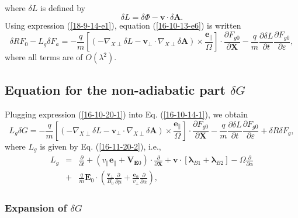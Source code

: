 \documentclass{llncs}
\newcommand{\tmmathbf}[1]{\ensuremath{\boldsymbol{#1}}}
\begin{document}
where $\delta L$ is defined by
\begin{equation}
  \label{19-1-2-p1} \delta L = \delta \Phi -\mathbf{v} \cdot \delta
  \mathbf{A}.
\end{equation}
Using expression (\ref{18-9-14-e1}), equation (\ref{16-10-13-e6}) is written
\begin{equation}
  \label{16-10-20-1} \delta R F_0 - L_g \delta F_a = - \frac{q}{m} \left[ (-
  \nabla_{X \perp} \delta L -\mathbf{v}_{\perp} \cdot \nabla_{X \perp} \delta
  \mathbf{A}) \times \frac{\tmmathbf{e}_{\parallel}}{\Omega} \right] \cdot
  \frac{\partial F_{g 0}}{\partial \mathbf{X}} - \frac{q}{m}  \frac{\partial
  \delta L}{\partial t}  \frac{\partial F_{g 0}}{\partial \varepsilon},
\end{equation}
where all terms are of $O (\lambda^2)$.

\subsection{Equation for the non-adiabatic part $\delta G$}

Plugging expression (\ref{16-10-20-1}) into Eq. (\ref{16-10-14-1}), we obtain
\begin{equation}
  \label{16-10-14-3} L_g \delta G = - \frac{q}{m} \left[ (- \nabla_{X \perp}
  \delta L -\mathbf{v}_{\perp} \cdot \nabla_{X \perp} \delta \mathbf{A})
  \times \frac{\tmmathbf{e}_{\parallel}}{\Omega} \right] \cdot \frac{\partial
  F_{g 0}}{\partial \mathbf{X}} - \frac{q}{m}  \frac{\partial \delta
  L}{\partial t}  \frac{\partial F_{g 0}}{\partial \varepsilon} + \delta R
  \delta F_g,
\end{equation}
where $L_g$ is given by Eq. (\ref{16-11-20-2}), i.e.,
\begin{eqnarray}
  L_g & = & \frac{\partial}{\partial t} + (v_{\parallel}
  \mathbf{e}_{\parallel} +\mathbf{V}_{\mathbf{E}0}) \cdot
  \frac{\partial}{\partial \mathbf{X}} +\mathbf{v} \cdot
  [\tmmathbf{\lambda}_{B 1} +\tmmathbf{\lambda}_{B 2}] - \Omega
  \frac{\partial}{\partial \alpha} \nonumber\\
  & + & \frac{q}{m} \mathbf{E}_0 \cdot \left( \frac{\mathbf{v}_{\perp}}{B_0} 
  \frac{\partial}{\partial \mu} + \frac{\tmmathbf{e}_{\alpha}}{v_{\perp}} 
  \frac{\partial}{\partial \alpha} \right), 
\end{eqnarray}
\subsubsection{Expansion of $\delta G$}\label{17-5-5-p1}
\end{document}
